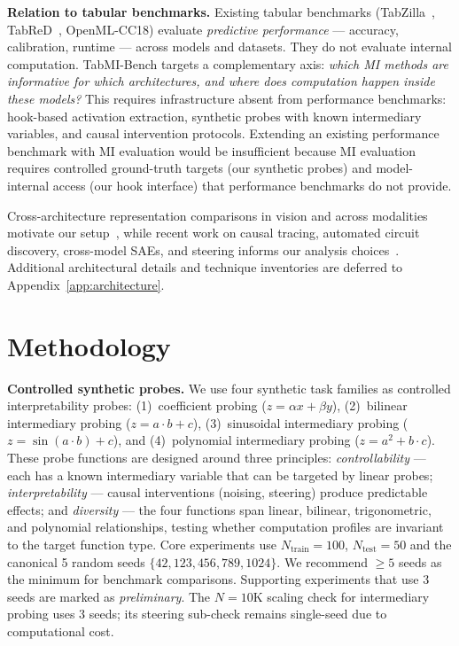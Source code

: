 \documentclass{article}
\begin{document}
\textbf{Relation to tabular benchmarks.} Existing tabular benchmarks (TabZilla~\cite{mcelfresh2024tabzilla}, TabReD~\cite{rubachev2024tabred}, OpenML-CC18) evaluate \textit{predictive performance} --- accuracy, calibration, runtime --- across models and datasets. They do not evaluate internal computation. TabMI-Bench targets a complementary axis: \textit{which MI methods are informative for which architectures, and where does computation happen inside these models?} This requires infrastructure absent from performance benchmarks: hook-based activation extraction, synthetic probes with known intermediary variables, and causal intervention protocols. Extending an existing performance benchmark with MI evaluation would be insufficient because MI evaluation requires controlled ground-truth targets (our synthetic probes) and model-internal access (our hook interface) that performance benchmarks do not provide.

Cross-architecture representation comparisons in vision and across modalities motivate our setup~\cite{zhou2022understanding,sirikova2026architecture,hosseini2025universality}, while recent work on causal tracing, automated circuit discovery, cross-model SAEs, and steering informs our analysis choices~\cite{meng2022locating,conmy2023acdc,marks2024sparse,mueller2024quest,jiralerspong2026crosscoders,kendiukhov2026causal,staniszewski2026tada,yang2026steplevel}. Additional architectural details and technique inventories are deferred to Appendix~\ref{app:architecture}.

\section{Methodology}

\textbf{Controlled synthetic probes.} We use four synthetic task families as controlled interpretability probes: (1)~coefficient probing ($z = \alpha x + \beta y$), (2)~bilinear intermediary probing ($z = a \cdot b + c$), (3)~sinusoidal intermediary probing ($z = \sin(a \cdot b) + c$), and (4)~polynomial intermediary probing ($z = a^2 + b \cdot c$). These probe functions are designed around three principles: \textit{controllability} --- each has a known intermediary variable that can be targeted by linear probes; \textit{interpretability} --- causal interventions (noising, steering) produce predictable effects; and \textit{diversity} --- the four functions span linear, bilinear, trigonometric, and polynomial relationships, testing whether computation profiles are invariant to the target function type. Core experiments use $N_\text{train}=100$, $N_\text{test}=50$ and the canonical 5 random seeds $\{42,123,456,789,1024\}$. We recommend $\geq 5$ seeds as the minimum for benchmark comparisons. Supporting experiments that use 3 seeds are marked as \textit{preliminary}. The $N{=}10$K scaling check for intermediary probing uses 3 seeds; its steering sub-check remains single-seed due to computational cost.
\end{document}
